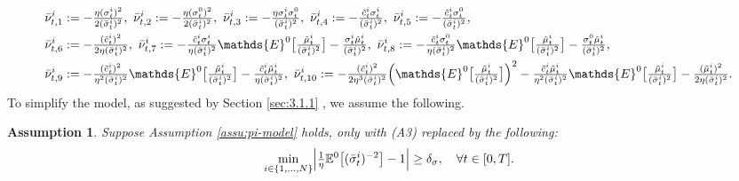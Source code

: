 \documentclass[10pt,a4paper]{article}
\theoremstyle{plain}
\newtheorem{Assumption}[Theorem]{Assumption}
\theoremstyle{definition}
\numberwithin{equation}{section}
\begin{document}
\begin{align}
& \bar{\nu}_{t,1}^{i} := -\tfrac{\eta (\sigma_{t}^{i})^{2}}{2(\bar{\sigma}_{t}^{i})^{2}}  , \  
\bar{\nu}_{t,2}^{i} := -\tfrac{\eta (\sigma_{t}^{0})^{2}}{2(\bar{\sigma}_{t}^{i})^{2}}  , \  
\bar{\nu}_{t,3}^{i} := -\tfrac{\eta\sigma_{t}^{i}\sigma_{t}^{0}}{(\bar{\sigma}_{t}^{i})^{2}}, \  \bar{\nu}_{t,4}^{i} := -\tfrac{\tilde{c}_{t}^i \sigma_{t}^{i}}{(\bar{\sigma}_{t}^{i})^{2}},  \ 
\bar{\nu}_{t,5}^{i} := -\tfrac{\tilde{c}_{t}^i \sigma_{t}^{0}}{(\bar{\sigma}_{t}^{i})^{2}},  \label{equ:barnu3} \\
&  \bar{\nu}_{t,6}^{i} := -\tfrac{(\tilde{c}_{t}^i)^{2}}{2\eta(\bar{\sigma}_{t}^{i})^{2}}, \ 
 \bar{\nu}_{t,7}^{i} := -\tfrac{\tilde{c}_{t}^i \sigma_{t}^{i}}{\eta(\bar{\sigma}_{t}^{i})^{2}}\mathds{E}^{0}\bigl[\tfrac{\tilde{\mu}_{t}^{i}}{(\bar{\sigma}_{t}^{i})^{2}}\bigr] - \tfrac{\sigma_{t}^{i}\tilde{\mu}_{t}^{i}}{(\bar{\sigma}_{t}^{i})^{2}}, \  
\bar{\nu}_{t,8}^{i} := -\tfrac{\tilde{c}_{t}^i \sigma_{t}^{0}}{\eta(\bar{\sigma}_{t}^{i})^{2}}\mathds{E}^{0}\bigl[\tfrac{\tilde{\mu}_{t}^{i}}{(\bar{\sigma}_{t}^{i})^{2}}\bigr] - \tfrac{\sigma_{t}^{0}\tilde{\mu}_{t}^{i}}{(\bar{\sigma}_{t}^{i})^{2}} \label{equ:barnu6}, \\
&\bar{\nu}_{t,9}^{i} := -\tfrac{(\tilde{c}_{t}^i)^{2}}{\eta^{2}(\bar{\sigma}_{t}^{i})^{2}}\mathds{E}^{0}\bigl[\tfrac{\tilde{\mu}_{t}^{i}}{(\bar{\sigma}_{t}^{i})^{2}}\bigr] - \tfrac{\tilde{c}_{t}^i \tilde{\mu}_{t}^{i}}{\eta(\bar{\sigma}_{t}^{i})^{2}},\  
\bar{\nu}_{t,10}^{i} := -\tfrac{(\tilde{c}_{t}^i)^{2}}{2\eta^{3}(\bar{\sigma}_{t}^{i})^{2}}\Bigl(\mathds{E}^{0}\bigl[\tfrac{\tilde{\mu}_{t}^{i}}{(\bar{\sigma}_{t}^{i})^{2}}\bigr]\Bigr)^{2} - \tfrac{\tilde{c}_{t}^i \tilde{\mu}_{t}^{i}}{\eta^{2}(\bar{\sigma}_{t}^{i})^{2}}\mathds{E}^{0}\bigl[\tfrac{\tilde{\mu}_{t}^{i}}{(\bar{\sigma}_{t}^{i})^{2}}\bigr] - \tfrac{(\tilde{\mu}_{t}^{i})^{2}}{2\eta(\bar{\sigma}_{t}^{i})^{2}}\label{equ:barnu10}.
\end{align}
To simplify the model, as suggested by Section \ref{sec:3.1.1} , we assume the following.
\begin{Assumption}\label{assu:mfmodel}
    Suppose Assumption \ref{assu:pi-model} holds, only with \textnormal{(A3)} replaced by the following: 
$$
\min_{i\in \{1,...,N\} } \Bigl|\tfrac{1}{\eta}\mathbb{E}^{0}\bigl[(\bar{\sigma}_{t}^{i})^{-2}\bigr]-1\Bigr| \geq \delta_{\sigma}, \ \ \ \forall t \in [0,T].
$$
\end{Assumption}
\end{document}
